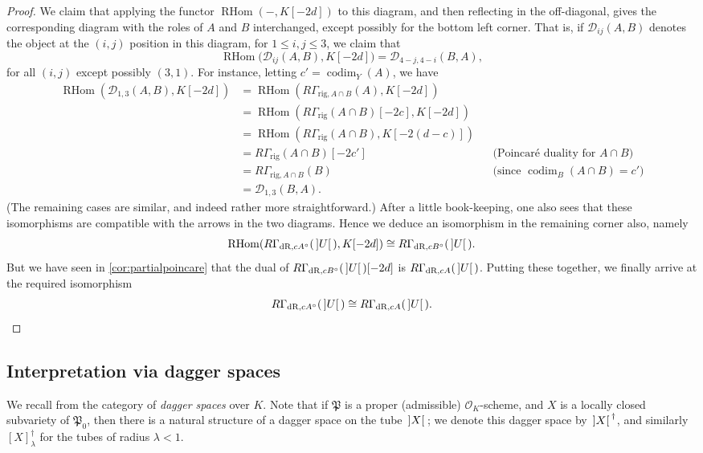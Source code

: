 \documentclass[cjm]{ipart}
\theoremstyle{plain}
\theoremstyle{remark}
\DeclareMathOperator{\codim}{codim}
\DeclarePairedDelimiter{\tb}{{\,]}}{{[\, }} %
\newcommand{\cD}{\mathcal{D}}
\newcommand{\cO}{\mathcal{O}}
\newcommand{\dR}{\mathrm{dR}}
\newcommand{\fP}{\mathfrak{P}}
\newcommand{\rig}{\mathrm{rig}}
\numberwithin{equation}{subsection}
\renewcommand{\le}{\leqslant}
\begin{document}
\begin{proof}
   We claim that applying the functor $\operatorname{RHom}(-, K[-2d])$ to this diagram, and then reflecting in the off-diagonal, gives the corresponding diagram with the roles of $A$ and $B$ interchanged, except possibly for the bottom left corner. That is, if $\cD_{ij}(A, B)$ denotes the object at the $(i, j)$ position in this diagram, for $1 \le i,j \le 3$, we claim that
   \[ \operatorname{RHom}\Big(\cD_{ij}(A, B), K[-2d]\Big) = \cD_{4-j, 4-i}(B, A),\]
   for all $(i, j)$ except possibly $(3, 1)$. For instance, letting $c' = \codim_Y(A)$, we have
   \begin{align*}
    \operatorname{RHom}(\cD_{1, 3}(A, B), K[-2d])&= \operatorname{RHom}(R\Gamma_{\rig, A \cap B}(A), K[-2d])\\
     &= \operatorname{RHom}(R\Gamma_{\rig}(A \cap B)[-2c], K[-2d]) \\
    &= \operatorname{RHom}(R\Gamma_{\rig}(A \cap B), K[-2(d-c)]) \\
    &= R\Gamma_{\rig}(A \cap B)[-2c'] &&\text{(Poincar\'e duality for $A \cap B$)}\\
    &= R\Gamma_{\rig, A \cap B}(B) &&\text{(since $\codim_{B}(A \cap B) = c'$)}\\
    &= \cD_{1, 3}(B, A).
   \end{align*}
   (The remaining cases are similar, and indeed rather more straightforward.) After a little book-keeping, one also sees that these isomorphisms are compatible with the arrows in the two diagrams. Hence we deduce an isomorphism in the remaining corner also, namely
   \[ \operatorname{RHom}(R\Gamma_{\dR, cA^\circ}(\tb{U}), K[-2d]) \cong R\Gamma_{\dR, cB^\circ}(\tb{U}).\]
   But we have seen in \cref{cor:partialpoincare} that the dual of $R\Gamma_{\dR, cB^\circ}(\tb{U})[-2d]$ is $R\Gamma_{\dR, cA}(\tb{U})$. Putting these together, we finally arrive at the required isomorphism
   \[ R\Gamma_{\dR, cA^\circ}(\tb{U}) \cong R\Gamma_{\dR, cA}(\tb{U}).\qedhere\]
  \end{proof}

 \subsection{Interpretation via dagger spaces}

  We recall from \cite{grossekloenne00} the category of \emph{dagger spaces} over $K$. Note that if $\fP$ is a proper (admissible) $\cO_K$-scheme, and $X$ is a locally closed subvariety of $\fP_0$, then there is a natural structure of a dagger space on the tube $\tb{X}$; we denote this dagger space by $\tb{X}^\dag$, and similarly $[X]^\dag_{\lambda}$ for the tubes of radius $\lambda < 1$.
\end{document}
